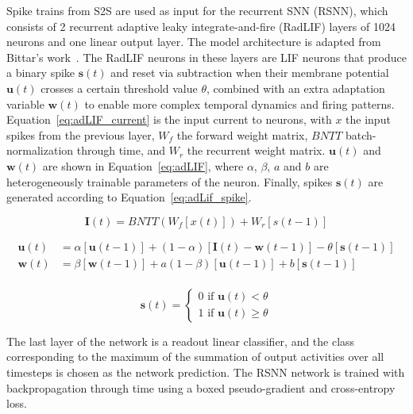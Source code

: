 Spike trains from S2S are used as input for the recurrent SNN (RSNN), which consists of 2 recurrent adaptive leaky integrate-and-fire (RadLIF) layers of 1024 neurons and one linear output layer. The model architecture is adapted from Bittar's work~\cite{bittar22surrogate}.
The RadLIF neurons in these layers are LIF neurons that produce a binary spike $\mathbf{s}(t)$ and reset via subtraction when their membrane potential $\mathbf{u}(t)$ crosses a certain threshold value $\theta$, combined with an extra adaptation variable $\mathbf{w}(t)$ to enable more complex temporal dynamics and firing patterns. Equation~\ref{eq:adLIF_current} is the input current to neurons, with $x$ the input spikes from the previous layer, $W_f$ the forward weight matrix, $BNTT$ batch-normalization through time, and $W_r$ the recurrent weight matrix. $\mathbf{u}(t)$ and $\mathbf{w}(t)$ are shown in Equation~\ref{eq:adLIF}, where $\alpha$, $\beta$, $a$ and $b$ are heterogeneously trainable parameters of the neuron. Finally, spikes $\mathbf{s}(t)$ are generated according to Equation~\ref{eq:adLif_spike}.

\begin{equation} \label{eq:adLIF_current}
    \mathbf{I}(t) = BNTT(W_f[x(t)]) + W_r[s(t-1)]
\end{equation}


\begin{equation}
    \label{eq:adLIF}
    \begin{aligned}
        \mathbf{u}(t) &= \alpha \left[ \mathbf{u}(t - 1) \right] + (1 - \alpha)\left[\mathbf{I}(t) - \mathbf{w}(t - 1)\right] - \theta [\mathbf{s}(t - 1)] \\
        \mathbf{w}(t) &= \beta [\mathbf{w}(t - 1)] + a (1 - \beta)  [\mathbf{u}(t - 1)] + b [\mathbf{s}(t - 1)] \\
    \end{aligned}
\end{equation}

\begin{equation} \label{eq:adLif_spike}
    \mathbf{s}(t) = 
    \begin{cases}
        0 \text{ if } \mathbf{u}(t) < \theta \\
        1 \text{ if } \mathbf{u}(t) \geq \theta
    \end{cases}
\end{equation}

The last layer of the network is a readout linear classifier, and the class corresponding to the maximum of the summation of output activities over all timesteps is chosen as the network prediction.
The RSNN network is trained with backpropagation through time using a boxed pseudo-gradient and cross-entropy loss.


